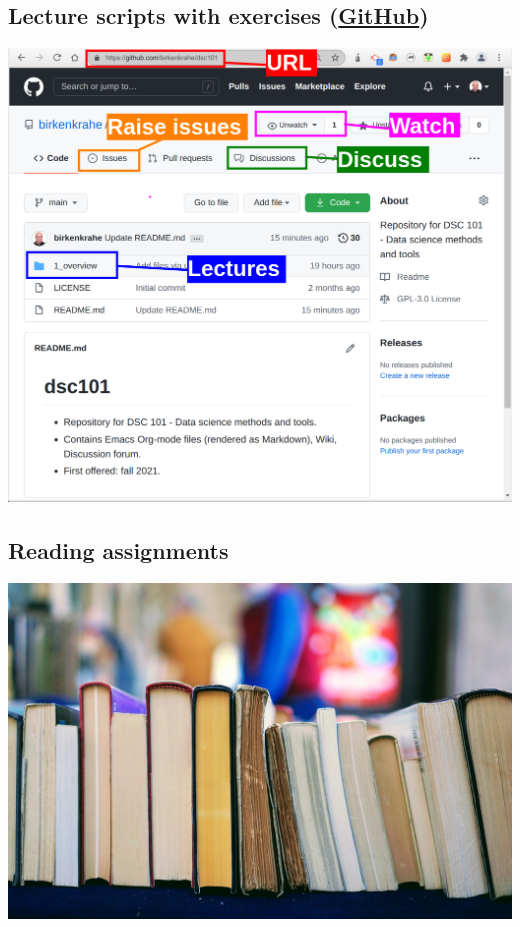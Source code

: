 \documentclass[11pt]{article}
\begin{document}
\subsection*{Lecture scripts with exercises (\href{https://github.com/birkenkrahe/mod482}{GitHub})}
\label{sec:orgb05dc97}

\begin{center}
\includegraphics[width=.9\linewidth]{./img/github.png}
\end{center}

\subsection*{Reading assignments}
\label{sec:org9780c9c}

\begin{center}
\includegraphics[width=.9\linewidth]{./img/books.jpeg}
\end{center}
\end{document}
